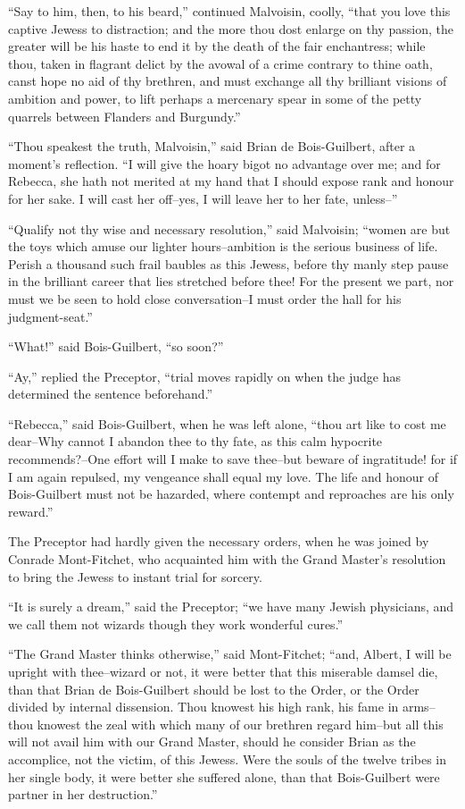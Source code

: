 ``Say to him, then, to his beard,'' continued Malvoisin, coolly, ``that
you love this captive Jewess to distraction; and the more thou dost
enlarge on thy passion, the greater will be his haste to end it by the
death of the fair enchantress; while thou, taken in flagrant delict by
the avowal of a crime contrary to thine oath, canst hope no aid of thy
brethren, and must exchange all thy brilliant visions of ambition and
power, to lift perhaps a mercenary spear in some of the petty quarrels
between Flanders and Burgundy.''

``Thou speakest the truth, Malvoisin,'' said Brian de Bois-Guilbert,
after a moment's reflection. ``I will give the hoary bigot no advantage
over me; and for Rebecca, she hath not merited at my hand that I should
expose rank and honour for her sake. I will cast her off--yes, I will
leave her to her fate, unless--''

``Qualify not thy wise and necessary resolution,'' said Malvoisin;
``women are but the toys which amuse our lighter hours--ambition is the
serious business of life. Perish a thousand such frail baubles as this
Jewess, before thy manly step pause in the brilliant career that lies
stretched before thee! For the present we part, nor must we be seen to
hold close conversation--I must order the hall for his judgment-seat.''

``What!'' said Bois-Guilbert, ``so soon?''

``Ay,'' replied the Preceptor, ``trial moves rapidly on when the judge
has determined the sentence beforehand.''

``Rebecca,'' said Bois-Guilbert, when he was left alone, ``thou art like
to cost me dear--Why cannot I abandon thee to thy fate, as this calm
hypocrite recommends?--One effort will I make to save thee--but beware
of ingratitude! for if I am again repulsed, my vengeance shall equal my
love. The life and honour of Bois-Guilbert must not be hazarded, where
contempt and reproaches are his only reward.''

The Preceptor had hardly given the necessary orders, when he was joined
by Conrade Mont-Fitchet, who acquainted him with the Grand Master's
resolution to bring the Jewess to instant trial for sorcery.

``It is surely a dream,'' said the Preceptor; ``we have many Jewish
physicians, and we call them not wizards though they work wonderful
cures.''

``The Grand Master thinks otherwise,'' said Mont-Fitchet; ``and, Albert,
I will be upright with thee--wizard or not, it were better that this
miserable damsel die, than that Brian de Bois-Guilbert should be lost to
the Order, or the Order divided by internal dissension. Thou knowest his
high rank, his fame in arms--thou knowest the zeal with which many of
our brethren regard him--but all this will not avail him with our Grand
Master, should he consider Brian as the accomplice, not the victim, of
this Jewess. Were the souls of the twelve tribes in her single body, it
were better she suffered alone, than that Bois-Guilbert were partner in
her destruction.''

